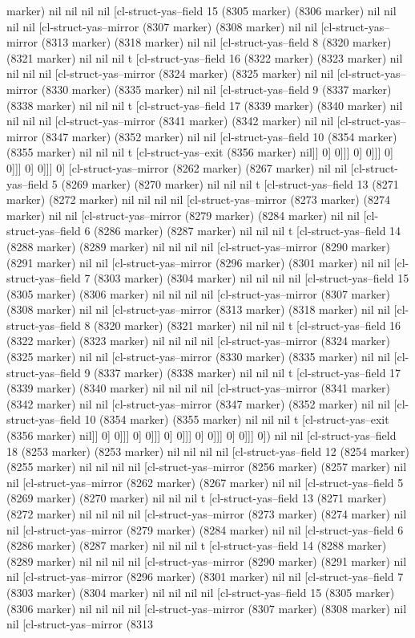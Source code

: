 {{marker) nil nil nil nil [cl-struct-yas--field 15 (8305 marker) (8306 marker) nil nil nil nil [cl-struct-yas--mirror (8307 marker) (8308 marker) nil nil [cl-struct-yas--mirror (8313 marker) (8318 marker) nil nil [cl-struct-yas--field 8 (8320 marker) (8321 marker) nil nil nil t [cl-struct-yas--field 16 (8322 marker) (8323 marker) nil nil nil nil [cl-struct-yas--mirror (8324 marker) (8325 marker) nil nil [cl-struct-yas--mirror (8330 marker) (8335 marker) nil nil [cl-struct-yas--field 9 (8337 marker) (8338 marker) nil nil nil t [cl-struct-yas--field 17 (8339 marker) (8340 marker) nil nil nil nil [cl-struct-yas--mirror (8341 marker) (8342 marker) nil nil [cl-struct-yas--mirror (8347 marker) (8352 marker) nil nil [cl-struct-yas--field 10 (8354 marker) (8355 marker) nil nil nil t [cl-struct-yas--exit (8356 marker) nil]] 0] 0]]] 0] 0]]] 0] 0]]] 0] 0]]] 0] [cl-struct-yas--mirror (8262 marker) (8267 marker) nil nil [cl-struct-yas--field 5 (8269 marker) (8270 marker) nil nil nil t [cl-struct-yas--field 13 (8271 marker) (8272 marker) nil nil nil nil [cl-struct-yas--mirror (8273 marker) (8274 marker) nil nil [cl-struct-yas--mirror (8279 marker) (8284 marker) nil nil [cl-struct-yas--field 6 (8286 marker) (8287 marker) nil nil nil t [cl-struct-yas--field 14 (8288 marker) (8289 marker) nil nil nil nil [cl-struct-yas--mirror (8290 marker) (8291 marker) nil nil [cl-struct-yas--mirror (8296 marker) (8301 marker) nil nil [cl-struct-yas--field 7 (8303 marker) (8304 marker) nil nil nil nil [cl-struct-yas--field 15 (8305 marker) (8306 marker) nil nil nil nil [cl-struct-yas--mirror (8307 marker) (8308 marker) nil nil [cl-struct-yas--mirror (8313 marker) (8318 marker) nil nil [cl-struct-yas--field 8 (8320 marker) (8321 marker) nil nil nil t [cl-struct-yas--field 16 (8322 marker) (8323 marker) nil nil nil nil [cl-struct-yas--mirror (8324 marker) (8325 marker) nil nil [cl-struct-yas--mirror (8330 marker) (8335 marker) nil nil [cl-struct-yas--field 9 (8337 marker) (8338 marker) nil nil nil t [cl-struct-yas--field 17 (8339 marker) (8340 marker) nil nil nil nil [cl-struct-yas--mirror (8341 marker) (8342 marker) nil nil [cl-struct-yas--mirror (8347 marker) (8352 marker) nil nil [cl-struct-yas--field 10 (8354 marker) (8355 marker) nil nil nil t [cl-struct-yas--exit (8356 marker) nil]] 0] 0]]] 0] 0]]] 0] 0]]] 0] 0]]] 0] 0]]] 0]) nil nil [cl-struct-yas--field 18 (8253 marker) (8253 marker) nil nil nil nil [cl-struct-yas--field 12 (8254 marker) (8255 marker) nil nil nil nil [cl-struct-yas--mirror (8256 marker) (8257 marker) nil nil [cl-struct-yas--mirror (8262 marker) (8267 marker) nil nil [cl-struct-yas--field 5 (8269 marker) (8270 marker) nil nil nil t [cl-struct-yas--field 13 (8271 marker) (8272 marker) nil nil nil nil [cl-struct-yas--mirror (8273 marker) (8274 marker) nil nil [cl-struct-yas--mirror (8279 marker) (8284 marker) nil nil [cl-struct-yas--field 6 (8286 marker) (8287 marker) nil nil nil t [cl-struct-yas--field 14 (8288 marker) (8289 marker) nil nil nil nil [cl-struct-yas--mirror (8290 marker) (8291 marker) nil nil [cl-struct-yas--mirror (8296 marker) (8301 marker) nil nil [cl-struct-yas--field 7 (8303 marker) (8304 marker) nil nil nil nil [cl-struct-yas--field 15 (8305 marker) (8306 marker) nil nil nil nil [cl-struct-yas--mirror (8307 marker) (8308 marker) nil nil [cl-struct-yas--mirror (8313 }}
